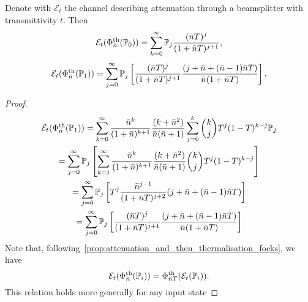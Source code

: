 \documentclass[a4paper]{report}
\newcommand{\PP}{\mathbb{P}}
\newcommand{\calE}{{\mathcal{E}}}
\begin{document}
\begin{prop}
	Denote with $\calE_t$ the channel describing attenuation through a beamsplitter with transmittivity $t$. Then
	\begin{equation}
		\calE_t(\Phi_{\bar n}^{\rm th}(\PP_0))
		= \sum_{k=0}^\infty \PP_j
		\frac{(\bar n T)^j}{(1+\bar n T)^{j+1}},
	\end{equation}
	\begin{equation}
		\calE_t(\Phi_{\bar n}^{\rm th}(\PP_1))
		= \sum_{j=0}^\infty \PP_j \left[
		\frac{(\bar n T)^j}{(1+\bar n T)^{j+1}}
		\frac{(j + \bar n + (\bar n-1)\bar nT)}{\bar n(1+\bar nT)}
		\right].
	\end{equation}
\end{prop}
\begin{proof}
	\begin{equation}
	\begin{gathered}
		\calE_t(\Phi_{\bar n}^{\rm th}(\PP_1))
		= \sum_{k=0}^\infty
		\frac{\bar n^k}{(1+\bar n)^{k+1}}
		\frac{(k+\bar n^2)}{\bar n(\bar n+1)}
		\sum_{j=0}^k
		\binom{k}{j} T^j (1-T)^{k-j} \PP_j \\
		= \sum_{j=0}^\infty \PP_j
		\left[
		\sum_{k=j}^\infty 
		\frac{\bar n^k}{(1+\bar n)^{k+1}}
		\frac{(k+\bar n^2)}{\bar n(\bar n+1)}
		\binom{k}{j} T^j (1-T)^{k-j}
		\right] \\
		= \sum_{j=0}^\infty \PP_j \left[
		T^j \frac{\bar n^{j-1}}{(1+\bar n T)^{j+2}}
		(j + \bar n + (\bar n-1)\bar nT)
		\right] \\
		= \sum_{j=0}^\infty \PP_j \left[
		\frac{(\bar n T)^j}{(1+\bar n T)^{j+1}}
		\frac{(j + \bar n + (\bar n-1)\bar nT)}{\bar n(1+\bar nT)}
		\right]
	\end{gathered}
	\end{equation}
	Note that, following~\cref{prop:attenuation_and_then_thermalisation_focks}, we have
	\begin{equation}
		\calE_t(\Phi_{\bar n}^{\rm th}(\PP_i))
		= \Phi^{\rm th}_{\bar nT}(\calE_t(\PP_i)).
	\end{equation}
	This relation holds more generally for any input state 
\end{proof}
\end{document}
